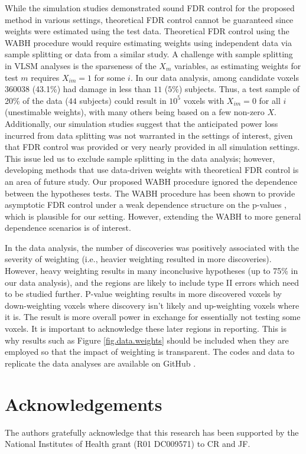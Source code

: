 \documentclass[bimj,fleqn]{w-art}
\theoremstyle{plain}
\theoremstyle{definition}
\begin{document}
While the simulation studies demonstrated sound FDR control for the proposed method in various settings, theoretical FDR control cannot be guaranteed since weights were estimated using the test data. Theoretical FDR control using the WABH procedure would require estimating weights using independent data via sample splitting or data from a similar study. A challenge with sample splitting in VLSM analyses is the sparseness of the $X_m$ variables, as estimating weights for test $m$ requires $X_{im}=1$ for some $i$. In our data analysis, among candidate voxels $360038$ (43.1\%) had damage in less than $11$ ($5\%$) subjects. Thus, a test sample of 20\% of the data ($44$ subjects) could result in $10^5$ voxels with $X_{im}=0$ for all $i$ (unestimable weights), with many others being based on a few non-zero $X$. Additionally, our simulation studies suggest that the anticipated power loss incurred from data splitting was not warranted in the settings of interest, given that FDR control was provided or very nearly provided in all simulation settings. This issue led us to exclude sample splitting in the data analysis; however, developing methods that use data-driven weights with theoretical FDR control is an area of future study. Our proposed WABH procedure ignored the dependence between the hypotheses tests. The WABH procedure has been shown to provide asymptotic FDR control under a weak dependence structure on the p-values \citep{Habiger2017}, which is plausible for our setting. However, extending the WABH to more general dependence scenarios is of interest.


In the data analysis, the number of discoveries was positively associated with the severity of weighting (i.e., heavier weighting resulted in more discoveries). However, heavy weighting results in many inconclusive hypotheses (up to 75\% in our data analysis), and the regions are likely to include type II errors which need to be studied further. P-value weighting results in more discovered voxels by down-weighting voxels where discovery isn't likely and up-weighting voxels where it is. The result is more overall power in exchange for essentially not testing some voxels. It is important to acknowledge these later regions in reporting. This is why results such as Figure \ref{fig.data.weights} should be included when they are employed so that the impact of weighting is transparent. The codes and data to replicate the data analyses are available on GitHub \cite{McLZhe22}.


\section*{Acknowledgements}
The authors gratefully acknowledge that this research has been supported by the National Institutes of Health grant (R01 DC009571) to CR and JF.



\end{document}
